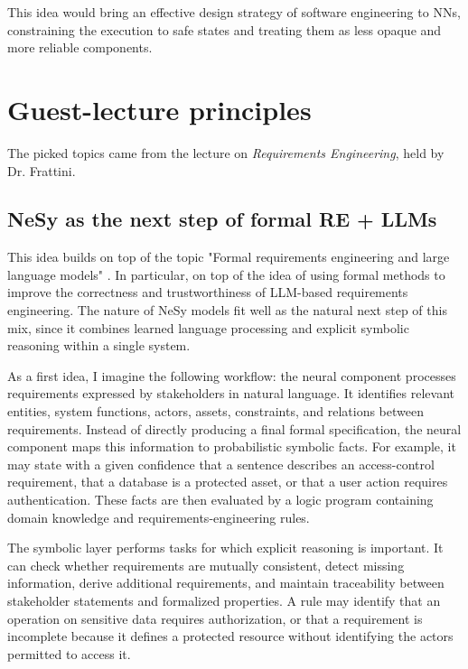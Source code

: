 \documentclass[11pt]{article}
\begin{document}
This idea would bring an effective design strategy of software engineering to NNs, constraining the execution to safe states and treating them as less opaque and more reliable components.

\section{Guest-lecture principles}

The picked topics came from the lecture on \textit{Requirements Engineering}, held by Dr. Frattini. 

\subsection{NeSy as the next step of formal RE + LLMs}

This idea builds on top of the topic "Formal requirements engineering and large language models" \cite{FERRARI2025107697}. In particular, on top of the idea of using formal methods to improve the correctness and trustworthiness of LLM-based requirements engineering. The nature of NeSy models fit well as the natural next step of this mix, since it combines learned language processing and explicit symbolic reasoning within a single system.

As a first idea, I imagine the following workflow: the neural component processes requirements expressed by stakeholders in natural language. It identifies relevant entities, system functions, actors, assets, constraints, and relations between requirements. Instead of directly producing a final formal specification, the neural component maps this information to probabilistic symbolic facts. For example, it may state with a given confidence that a sentence describes an access-control requirement, that a database is a protected asset, or that a user action requires authentication. These facts are then evaluated by a logic program containing domain knowledge and requirements-engineering rules.

The symbolic layer performs tasks for which explicit reasoning is important. It can check whether requirements are mutually consistent, detect missing information, derive additional requirements, and maintain traceability between stakeholder statements and formalized properties. A rule may identify that an operation on sensitive data requires authorization, or that a requirement is incomplete because it defines a protected resource without identifying the actors permitted to access it.
\end{document}
